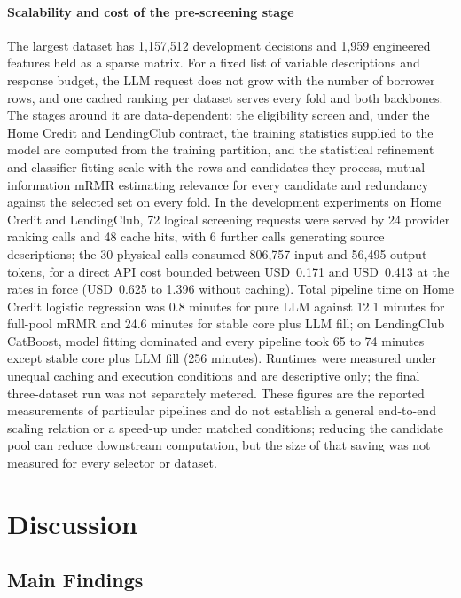 \documentclass[final,5p,twocolumn]{elsarticle}
\begin{document}
\paragraph{Scalability and cost of the pre-screening stage}
The largest dataset has 1,157,512 development decisions and 1,959 engineered features held as a sparse matrix. For a fixed list of variable descriptions and response budget, the LLM request does not grow with the number of borrower rows, and one cached ranking per dataset serves every fold and both backbones. The stages around it are data-dependent: the eligibility screen and, under the Home Credit and LendingClub contract, the training statistics supplied to the model are computed from the training partition, and the statistical refinement and classifier fitting scale with the rows and candidates they process, mutual-information mRMR estimating relevance for every candidate and redundancy against the selected set on every fold. In the development experiments on Home Credit and LendingClub, 72 logical screening requests were served by 24 provider ranking calls and 48 cache hits, with 6 further calls generating source descriptions; the 30 physical calls consumed 806,757 input and 56,495 output tokens, for a direct API cost bounded between USD~0.171 and USD~0.413 at the rates in force (USD~0.625 to 1.396 without caching). Total pipeline time on Home Credit logistic regression was 0.8 minutes for pure LLM against 12.1 minutes for full-pool mRMR and 24.6 minutes for stable core plus LLM fill; on LendingClub CatBoost, model fitting dominated and every pipeline took 65 to 74 minutes except stable core plus LLM fill (256 minutes). Runtimes were measured under unequal caching and execution conditions and are descriptive only; the final three-dataset run was not separately metered. These figures are the reported measurements of particular pipelines and do not establish a general end-to-end scaling relation or a speed-up under matched conditions; reducing the candidate pool can reduce downstream computation, but the size of that saving was not measured for every selector or dataset.


\section{Discussion}
\label{sec:discussion}

\subsection{Main Findings}
\label{subsec:main_findings}
\end{document}
